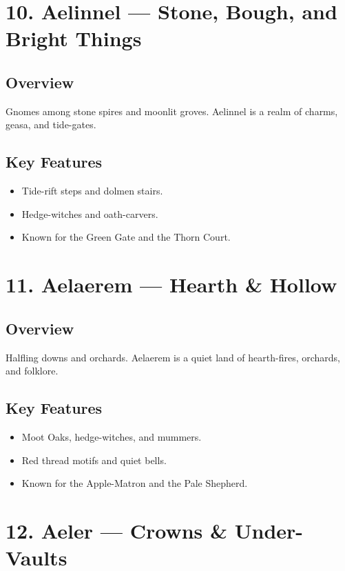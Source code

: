 \documentclass[11pt]{article}
\begin{document}
\section*{10. Aelinnel — Stone, Bough, and Bright Things}

\subsection*{Overview}
Gnomes among stone spires and moonlit groves. Aelinnel is a realm of charms, geasa, and tide-gates.

\subsection*{Key Features}
\begin{itemize}[leftmargin=*]
    \item Tide-rift steps and dolmen stairs.
    \item Hedge-witches and oath-carvers.
    \item Known for the Green Gate and the Thorn Court.
\end{itemize}

\section*{11. Aelaerem — Hearth \& Hollow}

\subsection*{Overview}
Halfling downs and orchards. Aelaerem is a quiet land of hearth-fires, orchards, and folklore.

\subsection*{Key Features}
\begin{itemize}[leftmargin=*]
    \item Moot Oaks, hedge-witches, and mummers.
    \item Red thread motifs and quiet bells.
    \item Known for the Apple-Matron and the Pale Shepherd.
\end{itemize}

\section*{12. Aeler — Crowns \& Under-Vaults}
\end{document}

